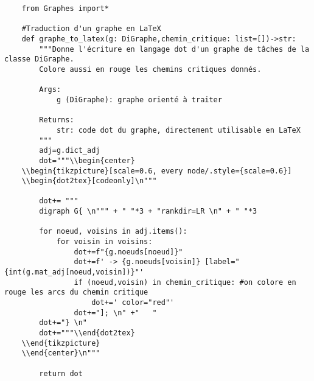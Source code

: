 \documentclass{article}
\begin{document}
\begin{verbatim}
    from Graphes import*

    #Traduction d'un graphe en LaTeX
    def graphe_to_latex(g: DiGraphe,chemin_critique: list=[])->str:
        """Donne l'écriture en langage dot d'un graphe de tâches de la classe DiGraphe.
        Colore aussi en rouge les chemins critiques donnés.

        Args:
            g (DiGraphe): graphe orienté à traiter

        Returns:
            str: code dot du graphe, directement utilisable en LaTeX
        """
        adj=g.dict_adj
        dot="""\\begin{center}
    \\begin{tikzpicture}[scale=0.6, every node/.style={scale=0.6}]
    \\begin{dot2tex}[codeonly]\n"""
        
        dot+= """
        digraph G{ \n""" + " "*3 + "rankdir=LR \n" + " "*3
        
        for noeud, voisins in adj.items():
            for voisin in voisins:
                dot+=f"{g.noeuds[noeud]}"
                dot+=f' -> {g.noeuds[voisin]} [label="{int(g.mat_adj[noeud,voisin])}"'
                if (noeud,voisin) in chemin_critique: #on colore en rouge les arcs du chemin critique
                    dot+=' color="red"'
                dot+="]; \n" +"   "
        dot+="} \n"
        dot+="""\\end{dot2tex}
    \\end{tikzpicture}
    \\end{center}\n"""

        return dot
\end{verbatim}
\end{document}
